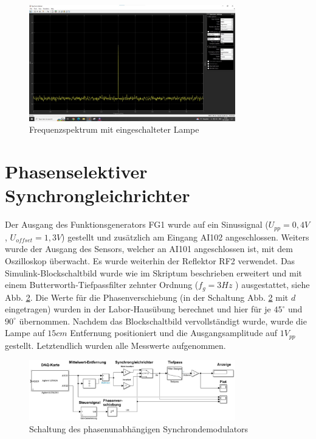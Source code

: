 \documentclass[a4paper]{article}
\begin{document}
\begin{figure}[h]
    \centering
    \includegraphics[width=0.8\textwidth]{images/6.3.4)ohne_lampe.jpg}
    \caption{Frequenzspektrum mit eingeschalteter Lampe}
    \label{fig:6-3-4-ohneLA1}
\end{figure}

\section{Phasenselektiver Synchrongleichrichter}
Der Ausgang des Funktionsgenerators FG1 wurde auf ein Sinussignal ($U_{pp}=0,4\unit{V}$,
$U_{offset}=1,3\unit{V}$) gestellt und zusätzlich am Eingang AI102 angeschlossen.
Weiters wurde der Ausgang des Sensors, welcher an AI101 angeschlossen ist, mit dem
Oszilloskop überwacht. Es wurde weiterhin der Reflektor RF2 verwendet.\newline
Das Simulink-Blockschaltbild wurde wie im Skriptum beschrieben erweitert und mit
einem Butterworth-Tiefpassfilter zehnter Ordnung ($f_{g}=3\unit{Hz}$ ) ausgestattet,
siehe Abb. \ref{fig:6-3-5-schaltung}. Die Werte für die Phasenverschiebung (in der Schaltung
Abb. \ref{fig:6-3-5-schaltung} mit $d$ eingetragen) wurden in der Labor-Hausübung
berechnet und hier für je $45^\circ$ und  $90^\circ$ übernommen. \newline
Nachdem das Blockschaltbild vervollständigt wurde, wurde die Lampe auf $15\unit{cm}$
Entfernung positioniert und die Ausgangsamplitude auf $1 V_{pp}$ gestellt.
Letztendlich wurden alle Messwerte aufgenommen.

\begin{figure}[h]
    \centering
    \includegraphics[width=0.8\textwidth]{schematics/6.3.5)schaltung.jpg}
    \caption{Schaltung des phasenunabhängigen Synchrondemodulators}
    \label{fig:6-3-5-schaltung}
\end{figure}
\end{document}
